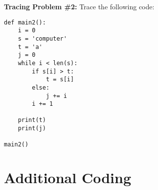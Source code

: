 \documentclass{article}
\begin{document}
\newpage

\textbf{Tracing Problem \#2:}  Trace the following code:

\vspace{0.15in}

\begin{verbatim}
def main2():
    i = 0
    s = 'computer'
    t = 'a'
    j = 0
    while i < len(s):
        if s[i] > t:
            t = s[i]
        else:
            j += i
        i += 1

    print(t)
    print(j)

main2()
\end{verbatim}

\vspace{0.15in}

\section*{Additional Coding}
\end{document}
